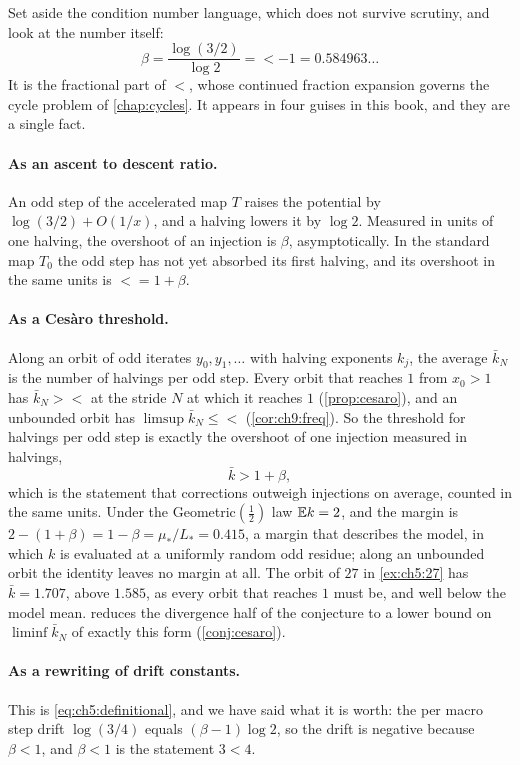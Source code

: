 Set aside the condition number language, which does not survive scrutiny, and
look at the number itself:
\begin{equation}\label{eq:ch5:beta}
  \beta=\frac{\log(3/2)}{\log 2}=\lt-1=0.584963\ldots
\end{equation}
It is the fractional part of $\lt$, whose continued fraction expansion governs
the cycle problem of \cref{chap:cycles}.  It appears in four guises in this
book, and they are a single fact.

\paragraph{As an ascent to descent ratio.}  An odd step of the accelerated map $T$
raises the potential by $\log(3/2)+O(1/x)$, and a halving lowers it by
$\log 2$.  Measured in units of one halving, the overshoot of an injection is
$\beta$, asymptotically.  In the standard map $T_0$ the odd step has not yet
absorbed its first halving, and its overshoot in the same units is
$\lt=1+\beta$.

\paragraph{As a Ces\`aro threshold.}  Along an orbit of odd iterates
$y_0,y_1,\dots$ with halving exponents $k_j$, the average $\bar k_N$ is the
number of halvings per odd step.  Every orbit that
reaches $1$ from $x_0>1$ has $\bar k_N>\lt$ at the stride $N$ at which it reaches $1$ (\cref{prop:cesaro}), and an unbounded orbit has
$\limsup\bar k_N\le\lt$ (\cref{cor:ch9:freq}).  So the threshold for halvings per odd step is
exactly the overshoot of one injection measured in halvings,
\[
  \bar k>1+\beta ,
\]
which is the statement that corrections outweigh injections on average,
counted in the same units.  Under the Geometric$(\tfrac12)$ law $\mathbb{E} k=2$, and
the margin is $2-(1+\beta)=1-\beta=\mu_\ast/L_\ast=0.415$, a margin that
describes the model, in which $k$ is evaluated at a uniformly random odd
residue; along an unbounded orbit the identity leaves no margin at all.  The
orbit of $27$ in \cref{ex:ch5:27} has $\bar k=1.707$, above $1.585$, as every
orbit that reaches $1$ must be, and well below the model mean.   reduces the divergence half of
the conjecture to a lower bound on $\liminf\bar k_N$ of exactly this form
(\cref{conj:cesaro}).

\paragraph{As a rewriting of drift constants.}  This is
\eqref{eq:ch5:definitional}, and we have said what it is worth: the per macro
step drift $\log(3/4)$ equals $(\beta-1)\log2$, so the drift is negative
because $\beta<1$, and $\beta<1$ is the statement $3<4$.

